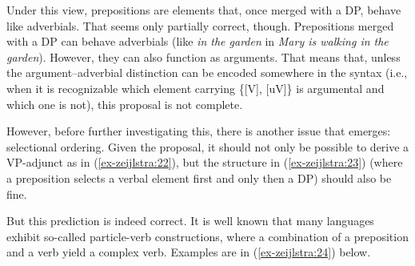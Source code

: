 \documentclass[output=paper
,modfonts
,nonflat]{langsci/langscibook}
\begin{document}
\begin{figure}[!h]
	\begin{exe}
	\end{exe} \vspace{-0.75cm}
\end{figure} 
\noindent Under this view, prepositions are elements that, once merged with a DP, behave like adverbials. That seems only partially correct, though. Prepositions merged with a DP can behave adverbials (like \textit{in the garden} in \textit{Mary is walking in the garden}). However, they can also function as arguments. That means that, unless the argument–adverbial distinction can be encoded somewhere in the syntax (i.e., when it is recognizable which element carrying \{[V], [uV]\} is argumental and which one is not), this proposal is not complete. 

However, before further investigating this, there is another issue that emerges: selectional ordering. Given the proposal, it should not only be possible to derive a VP-adjunct as in (\ref{ex-zeijlstra:22}), but the structure in (\ref{ex-zeijlstra:23}) (where a preposition selects a verbal element first and only then a DP) should also be fine.

\begin{figure}[!h]
	\begin{exe}
	\end{exe} \vspace{-0.5cm}
\end{figure} 
\begin{figure}[!h]
	\begin{exe}
	\end{exe} \vspace{-0.9cm}
\end{figure} 
\newpage \noindent But this prediction is indeed correct. It is well known that many languages exhibit so-called particle-verb constructions, where a combination of a preposition and a verb yield a complex verb. Examples are in (\ref{ex-zeijlstra:24}) below.
\end{document}
